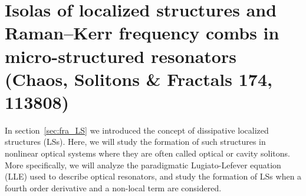 \chapter{Isolas of localized structures and Raman–Kerr frequency combs in micro-structured resonators (Chaos, Solitons \& Fractals 174, 113808)}

In section~\ref{sec:fra_LS} we introduced the concept of dissipative localized structures (LSs). Here, we will study the formation
of such structures in nonlinear optical systems where they are often called optical or cavity solitons. 
More specifically, we will analyze the paradigmatic Lugiato-Lefever equation (LLE) \cite{lugiatolefever1987} used to describe optical resonators, and
study the formation of LSs when a fourth order derivative and a non-local term are considered.